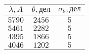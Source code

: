 \begin{tabular}{| c | c | c |}
\hline
$\lambda, A$ & $\theta, дел$ & $\sigma_{\theta}, дел$\\
\hline
$5790$ & $2456$ & $5$\\
\hline
$5461$ & $2282$ & $5$\\
\hline
$4395$ & $1866$ & $5$\\
\hline
$4046$ & $1202$ & $5$\\
\hline
\end{tabular}
